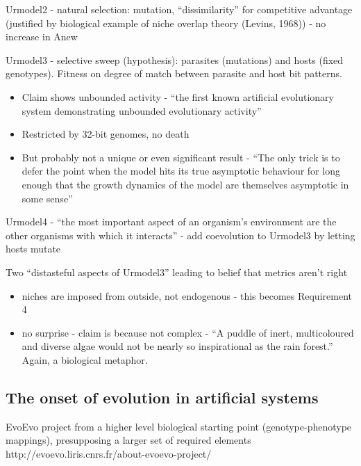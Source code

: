 Urmodel2 - natural selection: mutation, ``dissimilarity'' for
competitive advantage (justified by biological example of niche
overlap theory (Levins, 1968)) - no increase in Anew

Urmodel3 - selective sweep (hypothesis): parasites (mutations) and
hosts (fixed genotypes). Fitness on degree of match between parasite
and host bit patterns.

\begin{itemize}
	\item
	
	Claim shows unbounded activity - ``the first known artificial
	evolutionary system demonstrating unbounded evolutionary activity''
	
	\item
	
	Restricted by 32-bit genomes, no death
	
	\item
	
	But probably not a unique or even significant result - ``The only
	trick is to defer the point when the model hits its true asymptotic
	behaviour for long enough that the growth dynamics of the model are
	themselves asymptotic in some sense''
	
\end{itemize}

Urmodel4 - ``the most important aspect of an organism's environment
are the other organisms with which it interacts'' - add coevolution to
Urmodel3 by letting hosts mutate

Two ``distasteful aspects of Urmodel3'' leading to belief that metrics
aren't right

\begin{itemize}
	\item niches are imposed from outside, not endogenous - this becomes Requirement 4
	\item no surprise - claim is because not complex - ``A puddle of inert,
	multicoloured and diverse algae would not be nearly so inspirational
	as the rain forest.'' Again, a biological metaphor.	
\end{itemize}

\subsection{The onset of evolution in artificial systems}

EvoEvo project from a higher level biological starting point (genotype-phenotype mappings), presupposing a larger set of required elements
http://evoevo.liris.cnrs.fr/about-evoevo-project/

